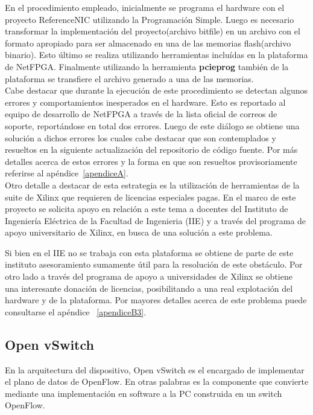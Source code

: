 En el procedimiento empleado, inicialmente se programa el hardware con el proyecto ReferenceNIC utilizando la Programaci\'on Simple. Luego es necesario transformar la implementaci\'on del proyecto(archivo bitfile) en un archivo con el formato apropiado para ser almacenado en una de las memorias flash(archivo binario). Esto \'ultimo se realiza utilizando herramientas inclu\'idas en la plataforma de NetFPGA. Finalmente utilizando la herramienta \textbf{pcieprog} también de la plataforma se transfiere el archivo generado a una de las memorias.\\

Cabe destacar que durante la ejecuci\'on de este procedimiento se detectan algunos errores y comportamientos inesperados en el hardware. Esto es reportado al equipo de desarrollo de NetFPGA a través de la lista oficial de correos de soporte, reportándose en total dos errores. Luego de este di\'alogo se obtiene una soluci\'on a dichos errores los cuales cabe destacar que son contemplados y resueltos en la siguiente actualizaci\'on del repositorio de c\'odigo fuente. Por m\'as detalles acerca de estos errores y la forma en que son resueltos provisoriamente referirse al ap\'endice~\ref{apendiceA}.\\

Otro detalle a destacar de esta estrategia es la utilizaci\'on de herramientas de la suite de Xilinx que requieren de licencias especiales pagas. En el marco de este proyecto se solicita apoyo en relaci\'on a este tema a docentes del Instituto de Ingeniería Eléctrica de la Facultad de Ingenieria (IIE) y a través del programa de apoyo universitario de Xilinx, en busca de una soluci\'on a este problema.

Si bien en el IIE no se trabaja con esta plataforma se obtiene de parte de este instituto asesoramiento sumamente \'util para la resoluci\'on de este obstáculo. Por otro lado a través del programa de apoyo a universidades de Xilinx se obtiene una interesante donaci\'on de licencias, posibilitando a una real explotaci\'on del hardware y de la plataforma. Por mayores detalles acerca de este problema puede consultarse el apéndice ~\ref{apendiceB3}.

\subsection{Open vSwitch}
En la arquitectura del dispositivo, Open vSwitch es el encargado de implementar el plano de datos de OpenFlow. En otras palabras es la componente que convierte mediante una implementaci\'on en software a la PC construida en un switch OpenFlow.\\

